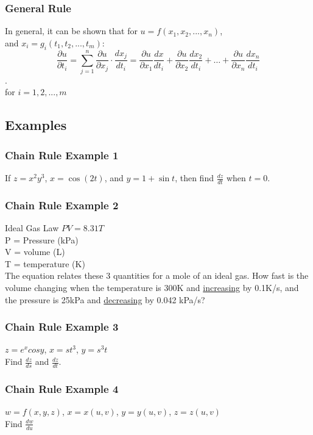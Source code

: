 \documentclass[12pt]{article}
\begin{document}
\subsubsection{General Rule}
In general, it can be shown that for \(u=f(x_1,x_2,...,x_n)\), \\%
and \(x_i = g_i(t_1,t_2,...,t_m)\):
\[
	\frac{\partial u}{\partial t_i} = \sum_{j=1}^{n} \frac{\partial u}{\partial x_j} \cdot \frac{dx_j}{dt_i} = \frac{\partial u}{\partial x_1} \frac{dx}{dt_i} + \frac{\partial u}{\partial x_2}\frac{dx_2}{dt_i} + \hdots + \frac{\partial u}{\partial x_n} \frac{dx_n}{dt_i} 
\].\\
for \(i=1,2,...,m\)
\subsection{Examples}
\subsubsection{Chain Rule Example 1}
If \(z=x^2y^3\), \(x=\cos(2t)\), and \(y=1+\sin t\), then find \(\frac{dz}{dt}\) when \(t=0\).

\subsubsection{Chain Rule Example 2}
Ideal Gas Law \(PV=8.31T\)\\
P = Pressure (kPa)\\
V = volume (L)\\
T = temperature (K)\\
The equation relates these 3 quantities for a mole of an ideal gas. How fast is the volume changing when the temperature is 300K and \underline{increasing} by 0.1K/s, and the pressure is 25kPa and \underline{decreasing} by 0.042 kPa/s?

\subsubsection{Chain Rule Example 3}
\(z=e^xcosy\),	\(x=st^3\), \(y=s^3t\)\\
Find \(\frac{dz}{ds}\) and \(\frac{dz}{dt}\).

\subsubsection{Chain Rule Example 4}
\(w=f(x,y,z)\), \(x=x(u,v)\), \(y=y(u,v)\), \(z=z(u,v)\)\\
Find \(\frac{dw}{du}\)
\end{document}

